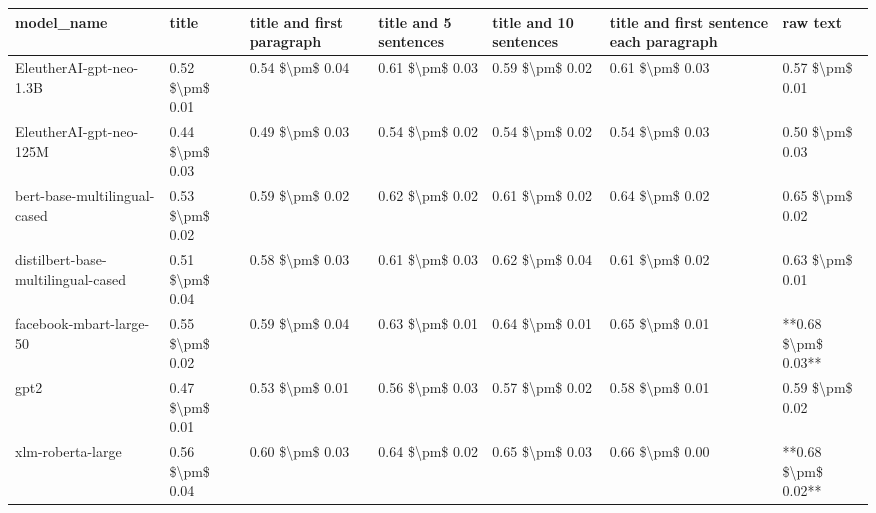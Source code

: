 \begin{tabular}{lllllll}
\toprule
                        model\_name &           title & title and first paragraph & title and 5 sentences & title and 10 sentences & title and first sentence each paragraph &            raw text \\
\midrule
           EleutherAI-gpt-neo-1.3B & 0.52 \$\textbackslash pm\$ 0.01 &           0.54 \$\textbackslash pm\$ 0.04 &       0.61 \$\textbackslash pm\$ 0.03 &        0.59 \$\textbackslash pm\$ 0.02 &                         0.61 \$\textbackslash pm\$ 0.03 &     0.57 \$\textbackslash pm\$ 0.01 \\
           EleutherAI-gpt-neo-125M & 0.44 \$\textbackslash pm\$ 0.03 &           0.49 \$\textbackslash pm\$ 0.03 &       0.54 \$\textbackslash pm\$ 0.02 &        0.54 \$\textbackslash pm\$ 0.02 &                         0.54 \$\textbackslash pm\$ 0.03 &     0.50 \$\textbackslash pm\$ 0.03 \\
      bert-base-multilingual-cased & 0.53 \$\textbackslash pm\$ 0.02 &           0.59 \$\textbackslash pm\$ 0.02 &       0.62 \$\textbackslash pm\$ 0.02 &        0.61 \$\textbackslash pm\$ 0.02 &                         0.64 \$\textbackslash pm\$ 0.02 &     0.65 \$\textbackslash pm\$ 0.02 \\
distilbert-base-multilingual-cased & 0.51 \$\textbackslash pm\$ 0.04 &           0.58 \$\textbackslash pm\$ 0.03 &       0.61 \$\textbackslash pm\$ 0.03 &        0.62 \$\textbackslash pm\$ 0.04 &                         0.61 \$\textbackslash pm\$ 0.02 &     0.63 \$\textbackslash pm\$ 0.01 \\
           facebook-mbart-large-50 & 0.55 \$\textbackslash pm\$ 0.02 &           0.59 \$\textbackslash pm\$ 0.04 &       0.63 \$\textbackslash pm\$ 0.01 &        0.64 \$\textbackslash pm\$ 0.01 &                         0.65 \$\textbackslash pm\$ 0.01 & **0.68 \$\textbackslash pm\$ 0.03** \\
                              gpt2 & 0.47 \$\textbackslash pm\$ 0.01 &           0.53 \$\textbackslash pm\$ 0.01 &       0.56 \$\textbackslash pm\$ 0.03 &        0.57 \$\textbackslash pm\$ 0.02 &                         0.58 \$\textbackslash pm\$ 0.01 &     0.59 \$\textbackslash pm\$ 0.02 \\
                 xlm-roberta-large & 0.56 \$\textbackslash pm\$ 0.04 &           0.60 \$\textbackslash pm\$ 0.03 &       0.64 \$\textbackslash pm\$ 0.02 &        0.65 \$\textbackslash pm\$ 0.03 &                         0.66 \$\textbackslash pm\$ 0.00 & **0.68 \$\textbackslash pm\$ 0.02** \\
\bottomrule
\end{tabular}
